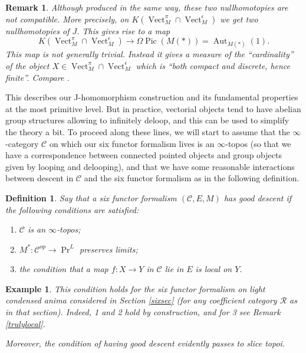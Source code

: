 \documentclass[12pt]{article}
\newtheorem{definition}[theorem]{Definition}
\newtheorem{example}[theorem]{Example}
\newtheorem{remark}[theorem]{Remark}
\newcommand{\on}{\operatorname}
\newcommand{\mc}{\mathcal}
\begin{document}
\begin{remark}
Although produced in the same way, these two nullhomotopies are not compatible.  More precisely, on  $K(\on{Vect}^\pi_M\cap \on{Vect}^\epsilon_M)$ we get two nullhomotopies of $J$.  This gives rise to a map
$$K(\on{Vect}^\pi_M\cap \on{Vect}^\epsilon_M) \to \Omega \on{Pic}(M(\ast))=\on{Aut}_{M(\ast)}(1).$$
This map is not generally trivial.  Instead it gives a measure of the ``cardinality'' of the object $X\in \on{Vect}^\pi_M\cap \on{Vect}^\epsilon_M$ which is ``both compact and discrete, hence finite''.  Compare \cite{CarmeliCardinality}.
\end{remark}

This describes our J-homomorphism construction and its fundamental properties at the most primitive level.  But in practice, vectorial objects tend to have abelian group structures allowing to infinitely deloop, and this can be used to simplify the theory a bit.  To proceed along these lines, we will start to assume that the $\infty$-category $\mathcal{C}$ on which our six functor formalism lives is an $\infty$-topos (so that we have a correspondence between connected pointed objects and group objects given by looping and delooping), and that we have some reasonable interactions between descent in $\mc{C}$ and the six functor formalism as in the following definition.

\begin{definition}
Say that a six functor formalism $(\mc{C},E,M)$ \emph{has good descent} if the following conditions are satisfied:
\begin{enumerate}
\item $\mathcal{C}$ is an $\infty$-topos;
\item $M^\ast:\mathcal{C}^{op}\to\on{Pr}^L$ preserves limits;
\item the condition that a map $f:X\to Y$ in $\mathcal{C}$ lie in $E$ is local on $Y$.
\end{enumerate}
\end{definition}

\begin{example}
This condition holds for the six functor formalism on light condensed anima considered in Section \ref{sixsec} (for any coefficient category $\mathcal{R}$ as in that section).  Indeed, 1 and 2 hold by construction, and for 3 see Remark \ref{trulylocal}.

Moreover, the condition of having good descent evidently passes to slice topoi.
\end{example}
\end{document}
